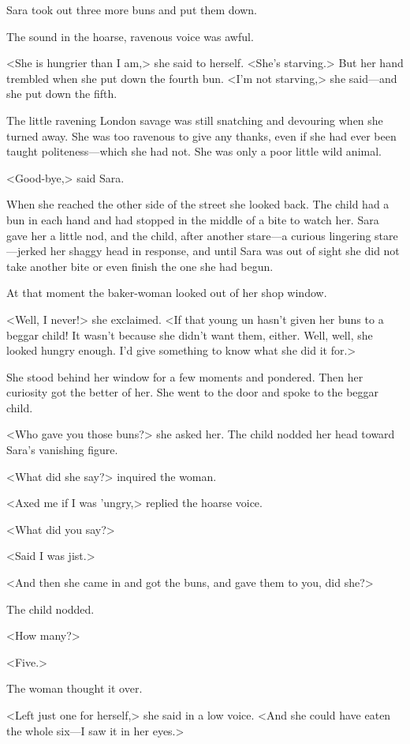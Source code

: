 Sara took out three more buns and put them down.

The sound in the hoarse, ravenous voice was awful.

<She is hungrier than I am,> she said to herself. <She's starving.> But her hand trembled when she put down the fourth bun. <I'm not starving,> she said—and she put down the fifth.

The little ravening London savage was still snatching and devouring when she turned away. She was too ravenous to give any thanks, even if she had ever been taught politeness—which she had not. She was only a poor little wild animal.

<Good-bye,> said Sara.

When she reached the other side of the street she looked back. The child had a bun in each hand and had stopped in the middle of a bite to watch her. Sara gave her a little nod, and the child, after another stare—a curious lingering stare—jerked her shaggy head in response, and until Sara was out of sight she did not take another bite or even finish the one she had begun.

At that moment the baker-woman looked out of her shop window.

<Well, I never!> she exclaimed. <If that young un hasn't given her buns to a beggar child! It wasn't because she didn't want them, either. Well, well, she looked hungry enough. I'd give something to know what she did it for.>

She stood behind her window for a few moments and pondered. Then her curiosity got the better of her. She went to the door and spoke to the beggar child.

<Who gave you those buns?> she asked her. The child nodded her head toward Sara's vanishing figure.

<What did she say?> inquired the woman.

<Axed me if I was 'ungry,> replied the hoarse voice.

<What did you say?>

<Said I was jist.>

<And then she came in and got the buns, and gave them to you, did she?>

The child nodded.

<How many?>

<Five.>

The woman thought it over.

<Left just one for herself,> she said in a low voice. <And she could have eaten the whole six—I saw it in her eyes.>

